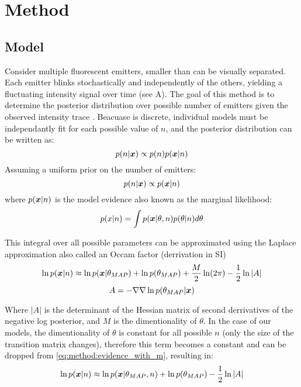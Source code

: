 \section{Method}

\subsection{Model}
Consider multiple fluorescent emitters, smaller than can be visually separated.
%
Each emitter blinks stochastically and independently of the others, 
yielding a fluctuating intensity signal over time (see  A).
%
The goal of this method is to determine the posterior distribution over possible number of emitters \ndist given the observed intensity trace \trace.
%
Beacuase \ndist is discrete, individual models must be independantly fit for each possible value of $n$, and the posterior distribution can be written as:
% 
\begin{equation*}
  p(n | \bm{x}) \propto p(n) p(\bm{x} | n)
\end{equation*}
%
Assuming a uniform prior on the number of emitters:
\begin{equation*}
  p(n | \bm{x}) \propto p(\bm{x} | n)
\end{equation*}
%
where $p(\bm{x}|n)$ is the model evidence also known as the marginal likelihood:
\begin{equation*}
  p(x | n) = \int p(\bm{x} | \theta, n) p(\theta | n) d\theta
\end{equation*}

This integral over all possible parameters can be approximated using the Laplace approximation also called an Occam factor (derrivation in SI)
\begin{equation}
  \ln p(\bm{x} | n) \approx \ln p(\bm{x} | \theta_{MAP}) + \ln p(\theta_{MAP}) + \frac{M}{2} \ln(2\pi) - \frac{1}{2} \ln |A|
  \label{eq:method:evidence_with_m}
\end{equation}
\begin{equation*}
  A = -\nabla \nabla \ln p(\theta_{MAP} | \bm{x})
\end{equation*}

%
Where $|A|$ is the determinant of the Hessian matrix of second derrivatives of the negative log posterior, and $M$ is the dimentionality of $\theta$. 
%
In the case of our models, the dimentionality of $\theta$ is constant for all possible $n$ (only the size of the transition matrix changes),
therefore this term becomes a constant and can be dropped from \eqref{eq:method:evidence_with_m}, resulting in:
\begin{equation}
  \ln p(\bm{x} | n) \approx \ln p(\bm{x} | \theta_{MAP}, n) + \ln p(\theta_{MAP}) - \frac{1}{2} \ln |A|
  \label{eq:method:evidence}
\end{equation}

